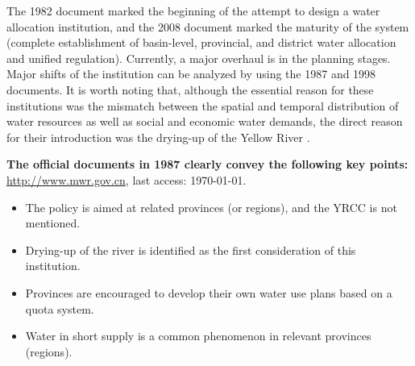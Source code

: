 The 1982 document marked the beginning of the attempt to design a water allocation institution, and the 2008 document marked the maturity of the system (complete establishment of basin-level, provincial, and district water allocation and unified regulation). Currently, a major overhaul is in the planning stages. Major shifts of the institution can be analyzed by using the 1987 and 1998 documents. It is worth noting that, although the essential reason for these institutions was the mismatch between the spatial and temporal distribution of water resources as well as social and economic water demands, the direct reason for their introduction was the drying-up of the Yellow River \cite{wangReviewImplementationYellow2019}.

\textbf{The official documents in 1987 clearly convey the following key points:}
\href{http://www.gov.cn/zhengce/content/2011-03/30/content_3138.htm#}{http://www.mwr.gov.cn}, last access: \today.
\begin{itemize}
	\item The policy is aimed at related provinces (or regions), and the YRCC is not mentioned.
	\item Drying-up of the river is identified as the first consideration of this institution.
	\item Provinces are encouraged to develop their own water use plans based on a quota system.
	\item Water in short supply is a common phenomenon in relevant provinces (regions).
\end{itemize}

